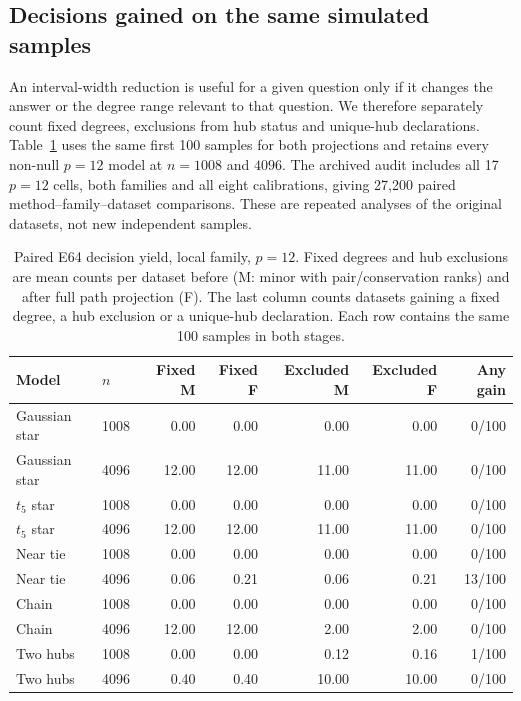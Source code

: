 \subsection{Decisions gained on the same simulated samples}\label{sec:decision-simulation}
An interval-width reduction is useful for a given question only if it changes the answer or the degree range relevant to that question. We therefore separately count fixed degrees, exclusions from hub status and unique-hub declarations. Table~\ref{tab:decision-simulation} uses the same first 100 samples for both projections and retains every non-null $p=12$ model at $n=1008$ and $4096$. The archived audit includes all 17 $p=12$ cells, both families and all eight calibrations, giving 27,200 paired method--family--dataset comparisons. These are repeated analyses of the original datasets, not new independent samples.


\begin{table}[H]\centering\small
\setlength{\tabcolsep}{4pt}
\caption{Paired E64 decision yield, local family, $p=12$. Fixed degrees and hub exclusions are mean counts per dataset before (M: minor with pair/conservation ranks) and after full path projection (F). The last column counts datasets gaining a fixed degree, a hub exclusion or a unique-hub declaration. Each row contains the same 100 samples in both stages.}\label{tab:decision-simulation}
\begin{lrbox}{\resultsbox}\begin{tabular}{llrrrrr}
\toprule
Model & $n$ & Fixed M & Fixed F & Excluded M & Excluded F & Any gain\\
\midrule
Gaussian star & 1008 & 0.00 & 0.00 & 0.00 & 0.00 & 0/100\\
Gaussian star & 4096 & 12.00 & 12.00 & 11.00 & 11.00 & 0/100\\
$t_5$ star & 1008 & 0.00 & 0.00 & 0.00 & 0.00 & 0/100\\
$t_5$ star & 4096 & 12.00 & 12.00 & 11.00 & 11.00 & 0/100\\
Near tie & 1008 & 0.00 & 0.00 & 0.00 & 0.00 & 0/100\\
Near tie & 4096 & 0.06 & 0.21 & 0.06 & 0.21 & 13/100\\
Chain & 1008 & 0.00 & 0.00 & 0.00 & 0.00 & 0/100\\
Chain & 4096 & 12.00 & 12.00 & 2.00 & 2.00 & 0/100\\
Two hubs & 1008 & 0.00 & 0.00 & 0.12 & 0.16 & 1/100\\
Two hubs & 4096 & 0.40 & 0.40 & 10.00 & 10.00 & 0/100\\
\bottomrule\end{tabular}\end{lrbox}\ifdim\wd\resultsbox>\linewidth\resizebox{\linewidth}{!}{\usebox{\resultsbox}}\else\usebox{\resultsbox}\fi\end{table}


